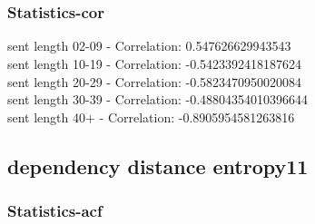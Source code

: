 \documentclass{article}%
\begin{document}
\begin{figure}[ht]%
\centering%
\setlength{\abovecaptionskip}{-35pt}%
%
%
\\%
%
%
\\%
%
\end{figure}

%
\newpage%
\subsubsection{Statistics{-}cor}%
\label{ssubsec:Statistics{-}cor}%
\noindent%
sent length 02-09 - Correlation: 0.547626629943543\\%
sent length 10-19 - Correlation: -0.5423392418187624\\%
sent length 20-29 - Correlation: -0.5823470950020084\\%
sent length 30-39 - Correlation: -0.48804354010396644\\%
sent length 40+ - Correlation: -0.8905954581263816\\

%
\newpage

%
\subsection{dependency distance entropy11}%
\label{subsec:dependencydistanceentropy11}%
\subsubsection{Statistics{-}acf}%
\label{ssubsec:Statistics{-}acf}%
\end{document}
